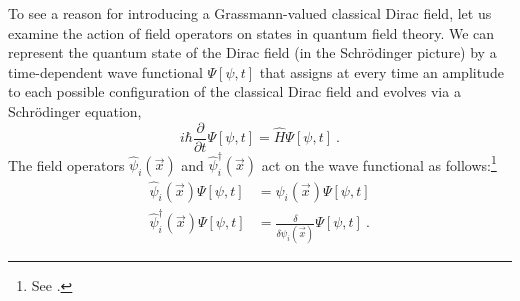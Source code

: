 \documentclass[12pt,secnumarabic,amsmath,amssymb,balancelastpage,nofootinbib]{article}
\begin{document}
To see a reason for introducing a Grassmann-valued classical Dirac field, let us examine the action of field operators on states in quantum field theory.  We can represent the quantum state of the Dirac field (in the Schr\"{o}dinger picture) by a time-dependent wave functional $\Psi[\psi,t]$ that assigns at every time an amplitude to each possible configuration of the classical Dirac field and evolves via a Schr\"{o}dinger equation,
\begin{equation}
i \hbar \frac{\partial}{\partial t}\Psi[\psi,t]=\widehat{H}\Psi[\psi,t]
\ .
\end{equation}
The field operators $\widehat{\psi}_i(\vec{x})$ and $\widehat{\psi}_i^{\dagger}(\vec{x})$ act on the wave functional as follows:\footnote{See \citet[pg.\ 217]{hatfield}.}
\begin{align}
\widehat{\psi}_i(\vec{x})\Psi[\psi,t]&=\psi_i(\vec{x})\Psi[\psi,t]
\nonumber
\\
\widehat{\psi}_i^{\dagger}(\vec{x})\Psi[\psi,t]&=\frac{\delta}{\delta \psi_i(\vec{x})}\Psi[\psi,t]
\label{fieldoperatorsonWFs}
\ .
\end{align}
\end{document}
